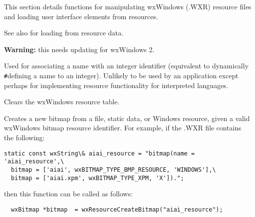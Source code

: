 
This section details functions for manipulating wxWindows (.WXR) resource
files and loading user interface elements from resources.



See also  for
loading from resource data.

{\bf Warning:} this needs updating for wxWindows 2.

\label{wxresourceaddidentifier}


Used for associating a name with an integer identifier (equivalent to dynamically\rtfsp
\verb$#$defining a name to an integer). Unlikely to be used by an application except
perhaps for implementing resource functionality for interpreted languages.



Clears the wxWindows resource table.



Creates a new bitmap from a file, static data, or Windows resource, given a valid
wxWindows bitmap resource identifier. For example, if the .WXR file contains
the following:

\begin{verbatim}
static const wxString\& aiai_resource = "bitmap(name = 'aiai_resource',\
  bitmap = ['aiai', wxBITMAP_TYPE_BMP_RESOURCE, 'WINDOWS'],\
  bitmap = ['aiai.xpm', wxBITMAP_TYPE_XPM, 'X']).";
\end{verbatim}

then this function can be called as follows:

\begin{verbatim}
  wxBitmap *bitmap  = wxResourceCreateBitmap("aiai_resource");
\end{verbatim}

